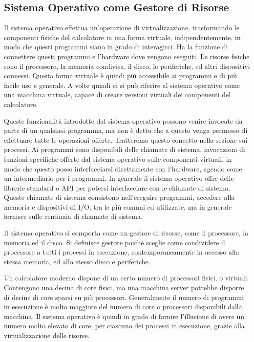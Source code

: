 \documentclass{article}
\numberwithin{equation}{subsection}
\begin{document}
\subsection{Sistema Operativo come Gestore di Risorse}

Il sistema operativo effettua un'operazione di virtualizzazione, trasformando le componenti fisiche del calcolatore in una forma virtuale, indipendentemente, in modo che 
questi programmi siano in grado di interagirci. Ha la funzione di connettere questi programmi e l'hardware dove vengono eseguiti. Le risorse fisiche sono il processore, 
la memoria condivisa, il disco, le periferiche, ed altri dispositivi connessi. Questa forma virtuale è quindi più accessibile ai programmi e di più facile uso e generale. 
A volte quindi ci si può riferire al sistema operativo come una macchina virtuale, capace di creare versioni virtuali dei componenti del calcolatore. 

Queste funzionalità introdotte dal sistema operativo possono venire invocate da parte di un qualsiasi programma, ma non è detto che a questo venga permesso di effettuare 
tutte le operazioni offerte. Tratteremo questo concetto nella sezione sui processi. 
Ai programmi sono disponibili delle chiamate di sistema, invocazioni di funzioni specifiche offerte dal sistema operativo sulle componenti virtuali, in modo che questo 
posso interfacciarsi direttamente con l'hardware, agendo come un intermediario per i programmi. In generale il sistema operativo offre delle librerie standard o API per 
potersi interfacciare con le chiamate di sistema. 
Queste chiamate di sistema consistono nell'eseguire programmi, accedere alla memoria e dispositivi di I/O, tra le più comuni ed utilizzate, ma in generale fornisce 
sulle centinaia di chiamate di sistema. 


Il sistema operativo si comporta come un gestore di risorse, come il processore, la memoria ed il disco. Si definisce gestore poiché sceglie come condividere il 
processore a tutti i processi in esecuzione, contemporaneamente in accesso alla stessa memoria, ed allo stesso disco e periferiche. 

Un calcolatore moderno dispone di un certo numero di processori fisici, o virtuali. Contengono una decina di core fisici, ma una macchina server potrebbe disporre di 
decine di core sparsi su più processori. Generalmente il numero di programmi in esecuzione è molto maggiore del numero di core o processori disponibili dalla macchina. 
Il sistema operativo è quindi in grado di fornire l'illusione di avere un numero molto elevato di core, per ciascuno dei processi in esecuzione, grazie alla virtualizzazione 
delle risorse. 
\end{document}
